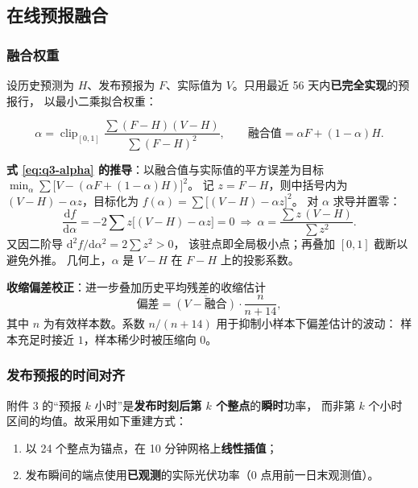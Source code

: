 \subsection{在线预报融合}

\subsubsection{融合权重}
\label{sec:q3-fusion}

设历史预测为 $H$、发布预报为 $F$、实际值为 $V$。只用最近 56 天内\textbf{已完全实现}的预报行，
以最小二乘拟合权重：

\begin{equation}
\alpha=\operatorname{clip}_{[0,1]}\frac{\sum(F-H)(V-H)}{\sum(F-H)^2},
\qquad \text{融合值}=\alpha F+(1-\alpha)H.
\label{eq:q3-alpha}
\end{equation}

\textbf{式 \eqref{eq:q3-alpha} 的推导}：以融合值与实际值的平方误差为目标
$\min_{\alpha}\sum\bigl[V-(\alpha F+(1-\alpha)H)\bigr]^2$。
记 $z=F-H$，则中括号内为 $(V-H)-\alpha z$，目标化为
$f(\alpha)=\sum\bigl[(V-H)-\alpha z\bigr]^2$。
对 $\alpha$ 求导并置零：
\begin{equation}
\frac{\mathrm{d}f}{\mathrm{d}\alpha}
=-2\sum z\bigl[(V-H)-\alpha z\bigr]=0
\ \Longrightarrow\ \alpha=\frac{\sum z\,(V-H)}{\sum z^2}.\label{eq:q3-alpha-deriv}
\end{equation}
又因二阶导 $\mathrm{d}^2f/\mathrm{d}\alpha^2=2\sum z^2>0$，
该驻点即全局极小点；再叠加 $[0,1]$ 截断以避免外推。
几何上，$\alpha$ 是 $V-H$ 在 $F-H$ 上的投影系数。

\textbf{收缩偏差校正}：进一步叠加历史平均残差的收缩估计
\begin{equation}
\text{偏差}=\overline{(V-\text{融合})}\cdot\frac{n}{n+14},
\end{equation}
其中 $n$ 为有效样本数。系数 $n/(n+14)$ 用于抑制小样本下偏差估计的波动：
样本充足时接近 $1$，样本稀少时被压缩向 $0$。

\subsubsection{发布预报的时间对齐}

附件 3 的“预报 $k$ 小时”是\textbf{发布时刻后第 $k$ 个整点}的\textbf{瞬时}功率，
而非第 $k$ 个小时区间的均值。故采用如下重建方式：

\begin{enumerate}[itemsep=2pt,topsep=3pt]
  \item 以 24 个整点为锚点，在 10 分钟网格上\textbf{线性插值}；
  \item 发布瞬间的端点使用\textbf{已观测}的实际光伏功率（0 点用前一日末观测值）。
\end{enumerate}

